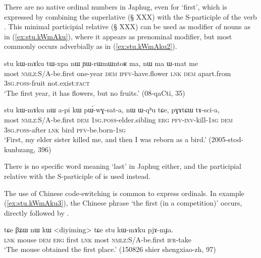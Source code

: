  There are no native ordinal numbers in Japhug, even for `first', which is expressed by combining the superlative  (§ XXX) with the S-participle of the verb . This minimal participial relative  (§ XXX) can be used as modifier of nouns as in (\ref{ex:stu.kWmAku}), where it appears as prenominal modifier, but most commonly occurs adverbially as in (\ref{ex:stu.kWmAku2}).  
 
\begin{exe}
\ex  \label{ex:stu.kWmAku}
 \gll stu kɯ-mɤku tɯ-xpa nɯ ɲɯ-rɯmɯntoʁ ma, nɯ ma ɯ-mat me \\
most \textsc{nmlz}:S/A-be.first one-year \textsc{dem} \textsc{ipfv}-have.flower \textsc{lnk} \textsc{dem} apart.from \textsc{3sg}.\textsc{poss}-fruit not.exist:\textsc{fact} \\
\glt `The first year, it has flowers, but no fruits.' (08-qaCti, 35)
  \end{exe}
  
\begin{exe}
\ex  \label{ex:stu.kWmAku2}
 \gll stu kɯ-mɤku nɯ a-pi kɯ pɯ́-wɣ-sat-a,  nɯ ɯ-qʰu tɕe, pɣɤtɕɯ tɤ-sci-a, \\
most \textsc{nmlz}:S/A-be.first \textsc{dem} \textsc{1sg}.\textsc{poss}-elder.sibling \textsc{erg} \textsc{pfv}-\textsc{inv}-kill-\textsc{1sg} \textsc{dem} \textsc{3sg}.\textsc{poss}-after \textsc{lnk} bird \textsc{pfv}-be.born-\textsc{1sg} \\
\glt `First, my elder sister killed me, and then I was reborn as a bird.' (2005-stod-kunbzang, 396)
\end{exe}

There is no specific word meaning `last' in Japhug either, and the participial relative   with the S-participle of  is used instead.

The use of Chinese code-switching is common to express ordinals. In example (\ref{ex:stu.kWmAku3}), the Chinese phrase   `the first (in a competition)' occurs, directly followed by .

\begin{exe}
\ex  \label{ex:stu.kWmAku3}
 \gll tɕe βʑɯ nɯ kɯ <diyiming> tɕe stu kɯ-mɤku pjɤ-mɟa. \\
 \textsc{lnk} mouse \textsc{dem} \textsc{erg} first \textsc{lnk} most \textsc{nmlz}:S/A-be.first \textsc{ifr}-take \\
\glt `The mouse obtained the first place.' (150826 shier shengxiao-zh, 97)
\end{exe}

